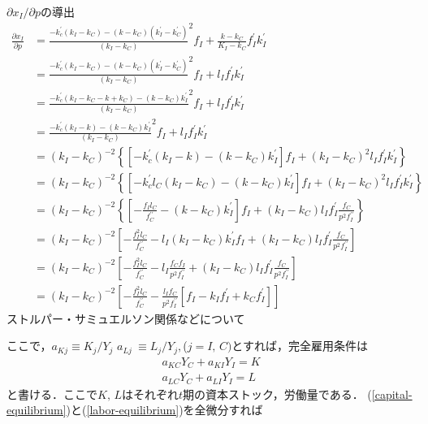 \documentclass[12pt,a4paper]{jsarticle}
\begin{document}
$\partial x_{I}/ \partial p$の導出
\begin{align}
 \frac{\partial x_{I}}{\partial p} &= \frac{-k_{c}^{\prime}(k_{I}-k_{C})- (k-k_{C})(k_{I}^{\prime} -k_{C}^{\prime})}{(k_{I}-k_{C})}^{2}f_{I} + \frac{k - k_{C}}{K_{I} - k_{C}}f_{I}^{\prime}k_{I}^{\prime} \\
&= \frac{-k_{c}^{\prime}(k_{I}-k_{C})- (k-k_{C})(k_{I}^{\prime} -k_{C}^{\prime})}{(k_{I}-k_{C})}^{2}f_{I} + l_{I}f_{I}^{\prime}k_{I}^{\prime} \\
&=\frac{-k_{c}^{\prime}(k_{I}-k_{C} -k +k_{C})- (k-k_{C})k_{I}^{\prime} }{(k_{I}-k_{C})}^{2}f_{I} + l_{I}f_{I}^{\prime}k_{I}^{\prime} \\
&=\frac{-k_{c}^{\prime}(k_{I} - k )- (k-k_{C})k_{I}^{\prime} }{(k_{I}-k_{C})}^{2}f_{I} + l_{I}f_{I}^{\prime}k_{I}^{\prime} \\
&= (k_{I} - k_{C})^{-2} \left\{\left[-k_{c}^{\prime}(k_{I} - k )- (k-k_{C})k_{I}^{\prime} \right] f_{I} + (k_{I} - k_{C})^{2} l_{I}f_{I}^{\prime}k_{I}^{\prime} \right\}  \\
&= (k_{I} - k_{C})^{-2} \left\{ \left[-k_{c}^{\prime} l_{C} (k_{I} - k_{C} )- (k-k_{C})k_{I}^{\prime} \right] f_{I} + (k_{I} - k_{C})^{2} l_{I}f_{I}^{\prime}k_{I}^{\prime} \right\} \\
&= (k_{I} - k_{C})^{-2} \left\{ \left[-\frac{f_{I}l_{C}}{f_{C}^{\prime \prime}}- (k-k_{C})k_{I}^{\prime} \right] f_{I} + (k_{I} - k_{C}) l_{I}f_{I}^{\prime} \frac{f_{C}}{p^{2}f_{I}^{\prime \prime}} \right\} \\
&= (k_{I} - k_{C})^{-2} \left[ -\frac{f_{I}^{2} l_{C}}{f_{C}^{\prime \prime}}- l_{I}(k_{I}-k_{C})k_{I}^{\prime}  f_{I} + (k_{I} - k_{C}) l_{I}f_{I}^{\prime} \frac{f_{C}}{p^{2}f_{I}^{\prime \prime}} \right] \\
&= (k_{I} - k_{C})^{-2} \left[ -\frac{f_{I}^{2} l_{C}}{f_{C}^{\prime \prime}}- l_{I} \frac{f_{C}f_{I} }{ p^{2}f_{I}^{\prime \prime}}+ (k_{I} - k_{C}) l_{I}f_{I}^{\prime} \frac{f_{C}}{p^{2}f_{I}^{\prime \prime}} \right] \\
&= (k_{I} - k_{C})^{-2} \left[ -\frac{f_{I}^{2} l_{C}}{f_{C}^{\prime \prime}}- \frac{ l_{I} f_{C} }{ p^{2}f_{I}^{\prime \prime}}\left[ f_{I} - k_{I}f_{I}^{\prime}  + k_{C}f_{I}^{\prime}  \right] \right]
\end{align}
ストルパー・サミュエルソン関係などについて

ここで，$a_{Kj} \equiv K_{j}/Y_{j}$ $a_{Lj} \ \equiv  L_{j}/Y_{j},$($j= I, \, C)$とすれば，完全雇用条件は
\begin{align}
 a_{KC}Y_{C} + a_{KI} Y_{I} =K \label{capital-equilibrium} \\
a_{LC}Y_{C} + a_{LI} Y_{I} = L \label{labor-equilibrium}
\end{align}
と書ける．ここで$K, \, L$はそれぞれ$t$期の資本ストック，労働量である．
(\ref{capital-equilibrium})と(\ref{labor-equilibrium})を全微分すれば
\end{document}

